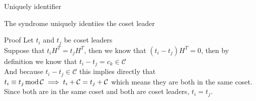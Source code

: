 \begin{parag}{Uniquely identifier}
    \begin{theoreme}
    The syndrome uniquely identiies the coset leader
    \end{theoreme}
    \begin{subparag}{Proof}
        Let $t_i$ and $t_j$ be coset leaders\\
	Suppose that $t_iH^T = t_j H^T$, then we know that $\left(t_i - t_j\right)H^T = 0$, then by definition we know that $t_i - t_j = c_k \in \mathcal{C}$\\
	And because $t_i - t_j \in \mathcal{C}$ this implies directly that $t_i \equiv t_j \operatorname{mod} \mathcal{C} \implies t_i + \mathcal{C} = t_j + \mathcal{C}$ which means they are both in the same coset. Since both are in the same coset and both are coset leaders, $t_i = t_j$.
    \end{subparag}
\end{parag}







